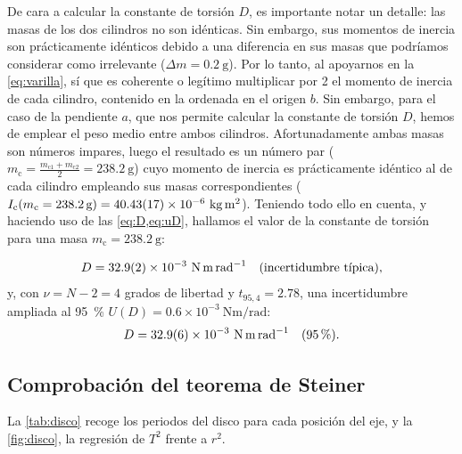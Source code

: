 \documentclass[a4paper,11pt]{amsart}
\numberwithin{equation}{section}
\newcommand{\Ic}{I_{\mathrm{c}}}              %
\newcommand{\mc}{m_{\mathrm{c}}}
\newcommand{\ext}[1]{U(#1)}                   %
\theoremstyle{cienplano}
\theoremstyle{ciendef}
\theoremstyle{cienobs}
\begin{document}
De cara a calcular la constante de torsión $D$, es importante notar un
detalle: las masas de los dos cilindros no son idénticas. Sin embargo, sus
momentos de inercia son prácticamente idénticos debido a una diferencia en
sus masas que podríamos considerar como irrelevante
($\Delta m=\SI{0,2}{\gram}$). Por lo tanto, al apoyarnos en la
\cref{eq:varilla}, sí que es coherente o legítimo multiplicar por 2 el
momento de inercia de cada cilindro, contenido en la ordenada en el origen
$b$. Sin embargo, para el caso de la pendiente $a$, que nos permite calcular
la constante de torsión $D$, hemos de emplear el peso medio entre ambos
cilindros. Afortunadamente ambas masas son números impares, luego el
resultado es un número par
($\mc=\frac{m_{\mathrm{c}1}+m_{\mathrm{c}2}}{2}=\SI{238,2}{\gram}$) cuyo
momento de inercia es prácticamente idéntico al de cada cilindro empleando
sus masas correspondientes
($\Ic(\mc=\SI{238,2}{\gram})=\num{40,43 \pm 0,17 e-6}\ \si{\kilogram\meter\squared}$).
Teniendo todo ello en cuenta, y haciendo uso de las
\cref{eq:D,eq:uD}, hallamos el valor de la constante de torsión para una
masa $\mc=\SI{238,2}{\gram}$:
\begin{destacado}
\vspace{-6pt}
\begin{equation*}
  D=\num{32,9 \pm 0,2 e-3}\ \si{\newton\meter\per\radian}
  \quad(\text{incertidumbre típica}),
\end{equation*}
{\small y, con $\nu=N-2=4$ grados de libertad y $t_{95,4}=\num{2,78}$, una
incertidumbre ampliada al \SI{95}{\percent}
$\ext{D}=\num{0,6}\times10^{-3}\ \si{\newton\meter\per\radian}$:}
\begin{equation*}
  D=\num{32,9 \pm 0,6 e-3}\ \si{\newton\meter\per\radian}
  \quad(\SI{95}{\percent}).
\end{equation*}
\end{destacado}

\subsection{Comprobación del teorema de Steiner}\label{sec:resSteiner}
La \cref{tab:disco} recoge los periodos del disco para cada posición del eje,
y la \cref{fig:disco}, la regresión de $T^{2}$ frente a $r^{2}$.
\end{document}
